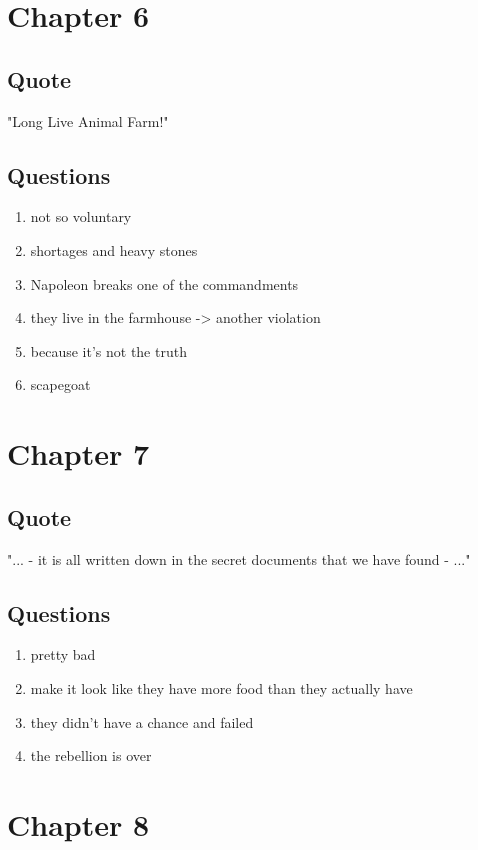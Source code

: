 \documentclass[8pt, letterpaper]{article}
\begin{document}
\section{Chapter 6}

\subsection{Quote}
"Long Live Animal Farm!"

\subsection{Questions}
\begin{enumerate}
  \item not so voluntary
  \item shortages and heavy stones
  \item Napoleon breaks one of the commandments
  \item they live in the farmhouse -> another violation
  \item because it's not the truth
  \item scapegoat
\end{enumerate}

\section{Chapter 7}

\subsection{Quote}
"... - it is all written down in the secret documents that we have found - ..."

\subsection{Questions}
\begin{enumerate}
  \item pretty bad
  \item make it look like they have more food than they actually have
  \item they didn't have a chance and failed
  \item the rebellion is over
\end{enumerate}

\section{Chapter 8}
\end{document}
